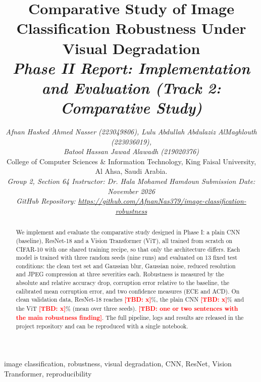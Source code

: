 \documentclass[conference]{IEEEtran}
\newcommand{\tbd}[1]{\textcolor{red}{\textbf{[TBD: #1]}}}
\begin{document}
\title{Comparative Study of Image Classification Robustness Under Visual Degradation\\[2pt]
{\large\itshape Phase II Report: Implementation and Evaluation (Track 2: Comparative Study)}}

\author{%
\textit{Afnan Hashed Ahmed Nasser (223049806), Lulu Abdullah Abdulaziz AlMaghlouth (223036019),}\\
\textit{Batool Hassan Jawad Alawadh (219020376)}\\
College of Computer Sciences \& Information Technology, King Faisal University, Al Ahsa, Saudi Arabia.\\
\textit{Group 2, Section 64 \enspace\textbar\enspace Instructor: Dr. Hala Mohamed Hamdoun \enspace\textbar\enspace Submission Date: November 2026}\\
\textit{GitHub Repository: \url{https://github.com/AfnanNas379/image-classification-robustness}}%
}

\maketitle

\begin{abstract}
We implement and evaluate the comparative study designed in Phase I: a plain CNN (baseline), ResNet-18 and a Vision Transformer (ViT), all trained from scratch on CIFAR-10 with one shared training recipe, so that only the architecture differs. Each model is trained with three random seeds (nine runs) and evaluated on 13 fixed test conditions: the clean test set and Gaussian blur, Gaussian noise, reduced resolution and JPEG compression at three severities each. Robustness is measured by the absolute and relative accuracy drop, corruption error relative to the baseline, the calibrated mean corruption error, and two confidence measures (ECE and ACD). On clean validation data, ResNet-18 reaches \tbd{x}\%, the plain CNN \tbd{x}\% and the ViT \tbd{x}\% (mean over three seeds). \tbd{one or two sentences with the main robustness finding}. The full pipeline, logs and results are released in the project repository and can be reproduced with a single notebook.
\end{abstract}

\begin{IEEEkeywords}
image classification, robustness, visual degradation, CNN, ResNet, Vision Transformer, reproducibility
\end{IEEEkeywords}
\end{document}
